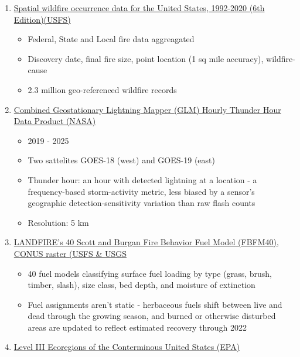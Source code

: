 \documentclass[11pt]{article}
\providecommand{\tightlist}{%
      \setlength{\itemsep}{0pt}\setlength{\parskip}{0pt}}
\begin{document}
\begin{enumerate}
\def\labelenumi{\arabic{enumi}.}
\tightlist
\item
  \href{https://www.fs.usda.gov/rds/archive/catalog/RDS-2013-0009.6}{Spatial
  wildfire occurrence data for the United States, 1992-2020 (6th
  Edition)(USFS)}

  \begin{itemize}
  \tightlist
  \item
    Federal, State and Local fire data aggreagated
  \item
    Discovery date, final fire size, point location (1 sq mile
    accuracy), wildfire-cause
  \item
    2.3 million geo-referenced wildfire records
  \end{itemize}
\item
  \href{https://search.earthdata.nasa.gov/search/granules/collection-details?p=C3894650367-GHRC_DAAC\&pg\%5B0\%5D\%5Bv\%5D=f\&pg\%5B0\%5D\%5Bgsk\%5D=-start_date\&q=Lightning\%20Mapper\&lat=40.780546668112606\&long=-83.81276234265948\&zoom=3.990854889796647}{Combined
  Geostationary Lightning Mapper (GLM) Hourly Thunder Hour Data Product
  (NASA)}

  \begin{itemize}
  \tightlist
  \item
    2019 - 2025
  \item
    Two sattelites GOES-18 (west) and GOES-19 (east)
  \item
    Thunder hour: an hour with detected lightning at a location - a
    frequency-based storm-activity metric, less biased by a sensor's
    geographic detection-sensitivity variation than raw flash counts
  \item
    Resolution: 5 km
  \end{itemize}
\item
  \href{https://www.sciencebase.gov/catalog/item/6a1602c7b66b013d45990b82}{LANDFIRE's
  40 Scott and Burgan Fire Behavior Fuel Model (FBFM40), CONUS raster
  (USFS \& USGS}

  \begin{itemize}
  \tightlist
  \item
    40 fuel models classifying surface fuel loading by type (grass,
    brush, timber, slash), size class, bed depth, and moisture of
    extinction
  \item
    Fuel assignments aren't static - herbaceous fuels shift between live
    and dead through the growing season, and burned or otherwise
    disturbed areas are updated to reflect estimated recovery through
    2022
  \end{itemize}
\item
  \href{https://www.epa.gov/eco-research/level-iii-and-iv-ecoregions-continental-united-states}{Level
  III Ecoregions of the Conterminous United States (EPA)}


\end{enumerate}
\end{document}
